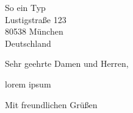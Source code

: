 \documentclass
[
    fontsize=12pt, %
    version=last,  %
    parskip=full   %
]
{scrlttr2}
\begin{document}
\begin{letter}
{%
    So ein Typ\\
    Lustigstraße 123\\
    80538 München\\
    Deutschland
}


\opening{Sehr geehrte Damen und Herren,}

lorem ipsum


\closing{Mit freundlichen Grüßen}




\end{letter}
\end{document}
